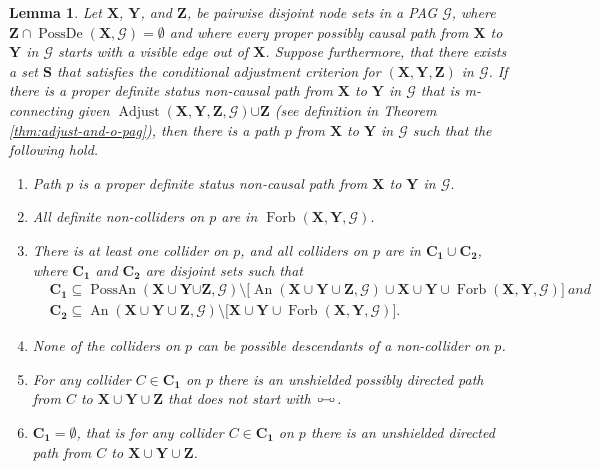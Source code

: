 \documentclass[twoside]{article}
\newtheorem{lemma}[theorem]{Lemma}
\DeclareMathOperator{\An}{An}
\DeclareMathOperator{\PossDe}{PossDe}
\DeclareMathOperator{\PossAn}{PossAn}
\DeclareMathOperator{\Forb}{Forb}
\newcommand{\fb}[2][X,Y]{\Forb(\mb{#1},#2)}
\DeclareMathOperator{\Adjust}{Adjust}
\newcommand{\adjustb}[2][X,Y,Z]{\Adjust(\mb{#1},#2)}
\newcommand{\mb}[1]{\mathbf{#1}}
\newcommand{\g}[1][G]{\mathcal{#1}}
\newcommand{\circcirc}{
  \setlength{\unitlength}{1mm}
  \begin{picture}(5,1)(0,0)
    \put(1,1){\circle{1}}
    \put(1.5,1){\line(1,0){2}}
    \put(4,1){\circle{1}}
  \end{picture}
}
\begin{document}
\begin{lemma}
\label{lem:adjust-and-o-pag-helper}
    Let $\mb{X}$, $\mb{Y}$, and $\mb{Z}$, be pairwise disjoint node sets in a PAG $\g$, where $\mb{Z} \cap \PossDe(\mb{X}, \g) = \emptyset$ and where every proper possibly causal path from $\mb{X}$ to $\mb{Y}$ in $\g$ starts with a visible edge out of $\mb{X}$. Suppose furthermore, that there exists a set $\mb{S}$ that satisfies the conditional adjustment criterion for $(\mb{X,Y,Z})$ in $\g$. If there is a proper definite status non-causal path from $\mb{X}$ to $\mb{Y}$ in $\g$ that is m-connecting given $\adjustb{\g} {\cup \mb{Z}}$ (see definition in Theorem \ref{thm:adjust-and-o-pag}), then there is a path $p$ from $\mb{X}$ to $\mb{Y}$ in $\g$ such that the following hold.
    \begin{enumerate}[label =(\roman*)]
        \item\label{opt-pag-prop1} Path $p$ is a proper definite status non-causal path from $\mb{X}$ to $\mb{Y}$ in $\g$.
        
        \item\label{opt-pag-prop2} All definite non-colliders on $p$ are in $\fb{\g}$.
        
        \item\label{opt-pag-prop3} There is at least one collider on $p$, and all colliders on $p$ are in $\mb{C_1} \cup \mb{C_2}$, where $\mb{C_1}$ and $\mb{C_2}$ are disjoint sets such that
        \begin{align*}
                & \mb{C_1} \subseteq \PossAn(\mb{X} \cup \mb{Y} {\cup \mb{Z}}, \g) \setminus \big[ \An(\mb{X} \cup \mb{Y} \cup \mb{Z}, \g) \cup {\mb{X} \cup \mb{Y} \cup \fb{\g}} \big]\ and \\
                &\mb{C_2} \subseteq \An(\mb{X} \cup \mb{Y} \cup \mb{Z}, \g) \setminus \big[ \mb{X} \cup \mb{Y} \cup \fb{\g}\big].
        \end{align*}
        
        \item\label{opt-pag-prop4} None of the colliders on $p$ can be possible descendants of a non-collider on $p$.
        
        \item\label{opt-pag-prop5} For any collider $C \in \mb{C_1}$ on $p$ there is an unshielded possibly directed path from $C$ to $\mb{X} \cup \mb{Y} \cup \mb{Z}$ that does not start with $\circcirc$.
        
        \item\label{opt-pag-prop6} $\mb{C_1} = \emptyset$, that is for any collider $C \in \mb{C_1}$ on $p$ there is an unshielded directed path from $C$ to $\mb{X} \cup \mb{Y} \cup \mb{Z}$.
    \end{enumerate}
\end{lemma}
\end{document}
